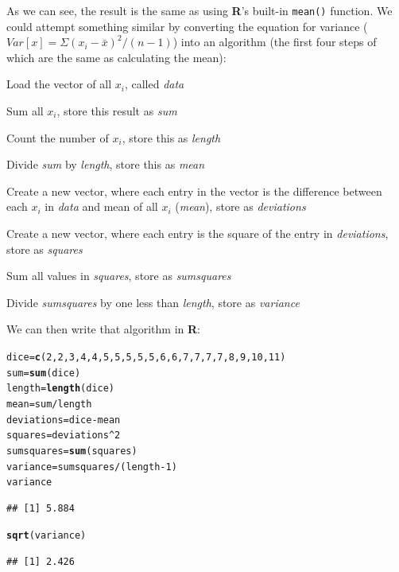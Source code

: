 \documentclass[12pt]{article}\usepackage[]{graphicx}\usepackage[]{color}
\makeatletter
\newcommand{\hlnum}[1]{\textcolor[rgb]{0.686,0.059,0.569}{#1}}%
\newcommand{\hlopt}[1]{\textcolor[rgb]{0,0,0}{#1}}%
\newcommand{\hlstd}[1]{\textcolor[rgb]{0.345,0.345,0.345}{#1}}%
\newcommand{\hlkwb}[1]{\textcolor[rgb]{0.69,0.353,0.396}{#1}}%
\newcommand{\hlkwd}[1]{\textcolor[rgb]{0.737,0.353,0.396}{\textbf{#1}}}%
\newenvironment{kframe}{%
 \def\at@end@of@kframe{}%
 \ifinner\ifhmode%
  \def\at@end@of@kframe{\end{minipage}}%
  \begin{minipage}{\columnwidth}%
 \fi\fi%
 \def\FrameCommand##1{\hskip\@totalleftmargin \hskip-\fboxsep
 \colorbox{shadecolor}{##1}\hskip-\fboxsep
     \hskip-\linewidth \hskip-\@totalleftmargin \hskip\columnwidth}%
 \MakeFramed {\advance\hsize-\width
   \@totalleftmargin\z@ \linewidth\hsize
   \@setminipage}}%
 {\par\unskip\endMakeFramed%
 \at@end@of@kframe}
\newenvironment{knitrout}{}{} %
\makeatother
\begin{document}
As we can see, the result is the same as using \textbf{R}'s built-in \verb|mean()| function. We could attempt something similar by converting the equation for variance ($Var[x]=\Sigma (x_{i} - \bar{x})^2 / (n-1)$) into an algorithm (the first four steps of which are the same as calculating the mean):
\begin{enumerate*}
\item Load the vector of all $x_i$, called \emph{data}
\item Sum all $x_i$, store this result as \emph{sum}
\item Count the number of $x_i$, store this as \emph{length}
\item Divide \emph{sum} by \emph{length}, store this as \emph{mean}
\item Create a new vector, where each entry in the vector is the difference between each $x_i$ in \emph{data} and mean of all $x_i$ (\emph{mean}),  store as \emph{deviations}
\item Create a new vector, where each entry is the square of the entry in \emph{deviations}, store as \emph{squares}
\item Sum all values in \emph{squares}, store as \emph{sumsquares}
\item Divide \emph{sumsquares} by one less than \emph{length}, store as \emph{variance}
\end{enumerate*}
We can then write that algorithm in \textbf{R}:
\begin{knitrout}
\color{fgcolor}\begin{kframe}
\begin{alltt}
\hlstd{dice} \hlkwb{=} \hlkwd{c}\hlstd{(}\hlnum{2}\hlstd{,} \hlnum{2}\hlstd{,} \hlnum{3}\hlstd{,} \hlnum{4}\hlstd{,} \hlnum{4}\hlstd{,} \hlnum{5}\hlstd{,} \hlnum{5}\hlstd{,} \hlnum{5}\hlstd{,} \hlnum{5}\hlstd{,} \hlnum{5}\hlstd{,} \hlnum{6}\hlstd{,} \hlnum{6}\hlstd{,} \hlnum{7}\hlstd{,} \hlnum{7}\hlstd{,} \hlnum{7}\hlstd{,} \hlnum{7}\hlstd{,} \hlnum{8}\hlstd{,} \hlnum{9}\hlstd{,} \hlnum{10}\hlstd{,} \hlnum{11}\hlstd{)}
\hlstd{sum} \hlkwb{=} \hlkwd{sum}\hlstd{(dice)}
\hlstd{length} \hlkwb{=} \hlkwd{length}\hlstd{(dice)}
\hlstd{mean} \hlkwb{=} \hlstd{sum}\hlopt{/}\hlstd{length}
\hlstd{deviations} \hlkwb{=} \hlstd{dice} \hlopt{-} \hlstd{mean}
\hlstd{squares} \hlkwb{=} \hlstd{deviations}\hlopt{^}\hlnum{2}
\hlstd{sumsquares} \hlkwb{=} \hlkwd{sum}\hlstd{(squares)}
\hlstd{variance} \hlkwb{=} \hlstd{sumsquares}\hlopt{/}\hlstd{(length} \hlopt{-} \hlnum{1}\hlstd{)}
\hlstd{variance}
\end{alltt}
\begin{verbatim}
## [1] 5.884
\end{verbatim}
\begin{alltt}
\hlkwd{sqrt}\hlstd{(variance)}
\end{alltt}
\begin{verbatim}
## [1] 2.426
\end{verbatim}
\end{kframe}
\end{knitrout}
\end{document}
